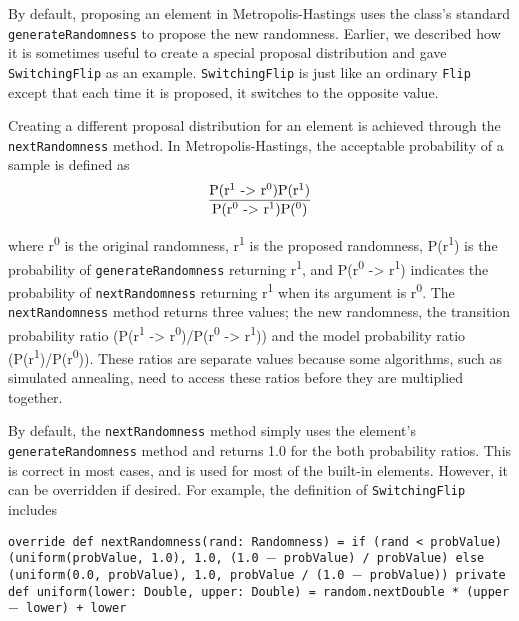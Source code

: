 By default, proposing an element in Metropolis-Hastings uses the class's standard \texttt{generateRandomness} to propose the new randomness. Earlier, we described how it is sometimes useful to create a special proposal distribution and gave \texttt{SwitchingFlip} as an example. \texttt{SwitchingFlip} is just like an ordinary \texttt{Flip} except that each time it is proposed, it switches to the opposite value.

Creating a different proposal distribution for an element is achieved through the \texttt{nextRandomness} method. In Metropolis-Hastings, the acceptable probability of a sample is defined as
\[\frac{\text{P(r\textsuperscript{1} -> r\textsuperscript{0})P(r\textsuperscript{1})}}{\text{P(r\textsuperscript{0} -> r\textsuperscript{1})P(\textsuperscript{0})}}\]

where r\textsuperscript{0} is the original randomness, r\textsuperscript{1} is the proposed randomness, P(r\textsuperscript{1}) is the probability of \texttt{generateRandomness} returning r\textsuperscript{1}, and P(r\textsuperscript{0} -> r\textsuperscript{1}) indicates the probability of \texttt{nextRandomness} returning r\textsuperscript{1} when its argument is r\textsuperscript{0}. The \texttt{nextRandomness} method returns three values; the new randomness, the transition probability ratio (P(r\textsuperscript{1} -> r\textsuperscript{0})/P(r\textsuperscript{0} -> r\textsuperscript{1})) and the model probability ratio (P(r\textsuperscript{1})/P(r\textsuperscript{0})). These ratios are separate values because some algorithms, such as simulated annealing, need to access these ratios before they are multiplied together.

By default, the \texttt{nextRandomness} method simply uses the element's \texttt{generateRandomness} method and returns 1.0 for the both probability ratios. This is correct in most cases, and is used for most of the built-in elements. However, it can be overridden if desired. For example, the definition of \texttt{SwitchingFlip} includes

\begin{flushleft}
\texttt{override def nextRandomness(rand: Randomness) =
\newline \tab if (rand < probValue)
\newline \tab (uniform(probValue, 1.0), 1.0, (1.0 $-$ probValue) / probValue)
\newline \tab else (uniform(0.0, probValue), 1.0, probValue / (1.0 $-$ probValue))
\newline 
\newline private def uniform(lower: Double, upper: Double) =
\newline \tab random.nextDouble * (upper $-$ lower) + lower
}
\end{flushleft}

